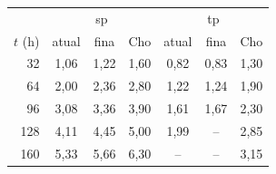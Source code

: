 \begin{tabular}{r|ccc|ccc}
\toprule
 & \multicolumn{3}{c|}{sp} & \multicolumn{3}{c}{tp}\\
$t$ (h) & atual & fina & Cho & atual & fina & Cho\\
\midrule
32 & 1{,}06 & 1{,}22 & 1{,}60 & 0{,}82 & 0{,}83 & 1{,}30\\
64 & 2{,}00 & 2{,}36 & 2{,}80 & 1{,}22 & 1{,}24 & 1{,}90\\
96 & 3{,}08 & 3{,}36 & 3{,}90 & 1{,}61 & 1{,}67 & 2{,}30\\
128 & 4{,}11 & 4{,}45 & 5{,}00 & 1{,}99 & -- & 2{,}85\\
160 & 5{,}33 & 5{,}66 & 6{,}30 & -- & -- & 3{,}15\\
\bottomrule
\end{tabular}
